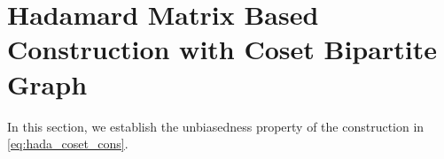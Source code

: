 \documentclass[journal,draftcls,onecolumn]{IEEEtran}
\theoremstyle{mystyle}
\begin{document}
\section{Hadamard Matrix Based Construction with Coset Bipartite Graph}
\label{app:hada_cos_unbiased}
\normalfont
In this section, we establish the unbiasedness property of the construction in \eqref{eq:hada_coset_cons}.


\end{document}
